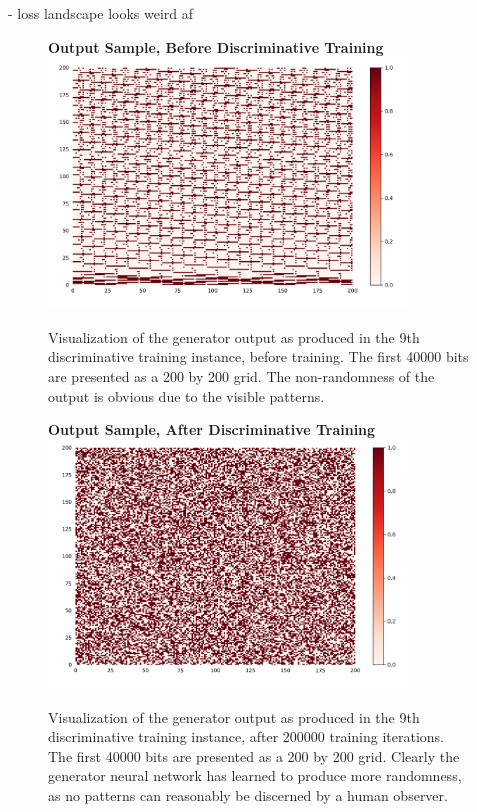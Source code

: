 \documentclass[12pt, titlepage]{report}
\theoremstyle{definition}
\begin{document}
{- loss landscape looks weird af

\begin{figure}
    \centering
    \textbf{Output Sample, Before Discriminative Training}
    \includegraphics[width=0.85\textwidth]{img/discriminative_before}\\
    \caption{Visualization of the generator output as produced in the 9th discriminative training instance, before training. The first 40000 bits are presented as a 200 by 200 grid. The non-randomness of the output is obvious due to the visible patterns.}
    \label{figure:visualize_discriminative_before}
    \end{figure}
    
    \begin{figure}
    \centering
    \textbf{Output Sample, After Discriminative Training}
    \includegraphics[width=0.85\textwidth]{img/discriminative_after}\\
    \caption{Visualization of the generator output as produced in the 9th discriminative training instance, after 200000 training iterations. The first 40000 bits are presented as a 200 by 200 grid. Clearly the generator neural network has learned to produce more randomness, as no patterns can reasonably be discerned by a human observer.}
    \label{figure:visualize_discriminative_after}
    \end{figure}
    
}
\end{document}
